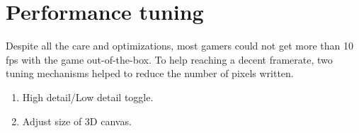 
\vspace{-1.25cm}
\section{Performance tuning}
Despite all the care and optimizations, most gamers could not get more than 10 fps with the game out-of-the-box. To help reaching a decent framerate, two tuning mechanisms helped to reduce the number of pixels written.
\begin{enumerate}
\item High detail/Low detail toggle.
\item Adjust size of 3D canvas.
\end{enumerate}
\par
{}\\
\par



